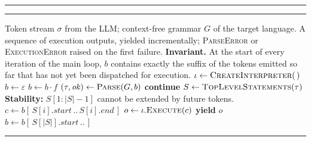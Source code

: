 \documentclass[14pt]{extarticle}
\begin{document}
\vspace*{5mm}%
\noindent
\begin{minipage}{\textwidth}
\hrule\vspace{2pt}\hrule\vspace{4pt}
\begin{algorithmic}[1]
\Require Token stream $\sigma$ from the LLM; context-free grammar $G$ of the target language.
\Ensure A sequence of execution outputs, yielded incrementally;
\Statex \hspace{1.5em} \textsc{ParseError} or \textsc{ExecutionError} raised on the first failure.
\Statex
\Statex \textbf{Invariant.} At the start of every iteration of the main loop, $b$ contains exactly the suffix of the tokens emitted so far that has not yet been dispatched for execution.
\Statex
{}
    \State $\iota \gets \Call{CreateInterpreter}{\,}$
    \State $b \gets \varepsilon$ 
        \State $b \gets b \cdot f$
        \State $(\tau, \mathit{ok}) \gets \Call{Parse}{G, b}$
        \Statex \hspace{2.45em} 
            \State \textbf{continue}
        \EndIf
        \State $S \gets \Call{TopLevelStatements}{\tau}$
            \Statex \hspace{2.45em} \textbf{Stability:} $S[1\!:\!|S|{-}1]$ cannot be extended by future tokens.
                \State $c \gets b[\,S[i].\mathit{start}\,..\,S[i].\mathit{end}\,]$
                \State $o \gets \iota.\Call{Execute}{c}$
                \State \textbf{yield} $o$
            \EndFor
            \State $b \gets b[\,S[|S|].\mathit{start}\,..\,]$
        \EndIf
    \EndFor
    \State {}
\EndProcedure
\end{algorithmic}
\vspace{4pt}\hrule
\end{minipage}
\end{document}
